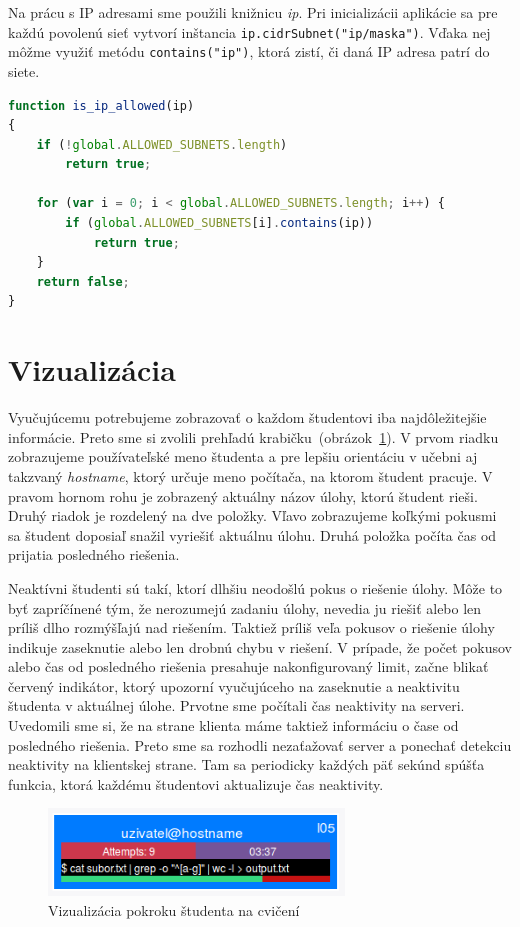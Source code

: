 Na prácu s IP adresami sme použili knižnicu \textit{ip}. Pri inicializácii
aplikácie sa pre každú povolenú sieť vytvorí inštancia
\verb'ip.cidrSubnet("ip/maska")'. Vďaka nej môžme využiť metódu
\verb'contains("ip")', ktorá zistí, či daná IP adresa patrí do siete.

\begin{lstlisting}[language=JavaScript]
function is_ip_allowed(ip)
{
    if (!global.ALLOWED_SUBNETS.length)
        return true;

    for (var i = 0; i < global.ALLOWED_SUBNETS.length; i++) {
        if (global.ALLOWED_SUBNETS[i].contains(ip))
            return true;
    }
    return false;
}
\end{lstlisting}

\section{Vizualizácia}
\label{sec:vizualization}

Vyučujúcemu potrebujeme zobrazovať o každom študentovi iba najdôležitejšie informácie.
Preto sme si zvolili prehľadú \glqq krabičku\grqq ~(obrázok~\ref{img:userbox}).
V prvom riadku zobrazujeme používateľské meno študenta a pre lepšiu orientáciu
v učebni aj takzvaný \textit{hostname}, ktorý určuje meno počítača, na ktorom
študent pracuje. V pravom hornom rohu je zobrazený aktuálny názov úlohy, ktorú študent
rieši. Druhý riadok je rozdelený na dve položky. Vľavo zobrazujeme koľkými pokusmi
sa študent doposiaľ snažil vyriešiť aktuálnu úlohu. Druhá položka počíta čas od
prijatia posledného riešenia.

Neaktívni študenti sú takí, ktorí dlhšiu neodošlú pokus o
riešenie úlohy. Môže to  byť zapríčínené tým, že nerozumejú zadaniu úlohy, nevedia ju
riešiť alebo len príliš dlho rozmýšľajú nad riešením. Taktiež príliš veľa pokusov
o riešenie úlohy indikuje zaseknutie alebo len drobnú chybu v riešení.
V prípade, že počet pokusov alebo čas od posledného
riešenia presahuje nakonfigurovaný limit, začne blikať červený indikátor, ktorý
upozorní vyučujúceho na zaseknutie a neaktivitu študenta v aktuálnej úlohe.
Prvotne sme počítali čas neaktivity na serveri. Uvedomili sme si, že na strane
klienta máme taktiež informáciu o čase od posledného riešenia. Preto sme sa rozhodli
nezaťažovať server a ponechať detekciu neaktivity na klientskej strane. Tam sa
periodicky každých päť sekúnd spúšťa funkcia, ktorá každému študentovi aktualizuje
čas neaktivity.

\begin{figure}[h]
	\centerline{\includegraphics[width=0.7\textwidth]{images/gta_monitor_box.png}}
	\caption[Vizualizácia pokroku študenta na cvičení]{Vizualizácia pokroku študenta na cvičení}
	\label{img:userbox}
\end{figure}


